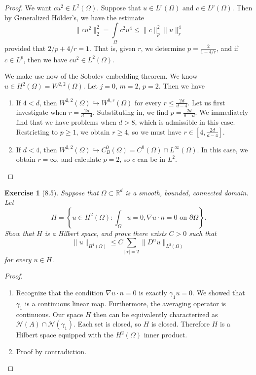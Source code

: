 \documentclass[letterpaper,twoside,11pt]{article}
\theoremstyle{mystyle}
\newtheorem*{exercise}{Exercise}
\newcommand{\R}{{\mathbb R}}
\begin{document}
\begin{proof}
  We want $cu^2 \in L^2 \left( \Omega \right)$. Suppose that $u \in L^r \left( \Omega \right)$ and $c \in L^p (\Omega)$. Then by Generalized H\"older's, we have the estimate
  \[\|cu^2 \|_2^2 = \int\limits_\Omega c^2 u^4 \leq \|c\|_p^2 \|u\|_r^4 \]
  provided that $2/p+4/r=1$. That is, given $r$, we determine $p = \frac{2}{1-4/r}$, and if $c \in L^p$, then we have $c u ^2 \in L^2 \left( \Omega \right)$.  

  We make use now of the Sobolev embedding theorem. We know $ u \in H^2 \left( \Omega \right) = W^{2, 2} \left( \Omega \right)$. Let $j = 0$, $m = 2$, $p = 2$. Then we have 
  \begin{enumerate}
    \item If $4 < d$, then $W^{2,2} (\Omega) \hookrightarrow W^{0,r}\left( \Omega \right)$ for every $r\leq \frac{2d}{d-4}$. Let us first investigate when $r = \frac{2d}{d-4}$. Substituting in, we find $p = \frac{2d}{8-d}$. We immediately find that we have problems when $ d > 8$, which is admissible in this case. Restricting to $p \geq 1$, we obtain $ r \geq 4$, so we must have $ r \in [4, \frac{2d}{d-4}]$. 
    
    \item If $d < 4$, then $W^{2,2} (\Omega) \hookrightarrow C_B^0 (\Omega) = C^0 (\Omega) \cap L^\infty (\Omega)$. In this case, we obtain $ r = \infty$, and calculate $ p = 2$, so $c$ can be in $L^2$. 
  \end{enumerate}
\end{proof}





\newpage
\begin{exercise}[8.5]
  Suppose that $\Omega \subset \R^d$ is a smooth, bounded, connected domain. Let 
  \[H = \left\{ u \in H^2 \left( \Omega \right)  : \int_\Omega u = 0, \nabla u \cdot n = 0 \text{ on } \partial \Omega  \right\}.\]
  Show that $H$ is a Hilbert space, and prove there exists $C > 0$ such that 
  \[\|u\|_{H^1 \left( \Omega \right) } \leq C \sum_{|\alpha| = 2} \|D^\alpha u \|_{L^2 (\Omega)}\]
  for every $u \in H$. 
\end{exercise}

\begin{proof}
  \begin{enumerate}
    \item Recognize that the condition $\nabla u \cdot n = 0$ is exactly $\gamma_1 u = 0$. We showed that $\gamma_1$ is a continuous linear map. Furthermore, the averaging operator is continuous. Our space $H$ then can be equivalently characterized as $\mathcal N (A) \cap \mathcal N(\gamma_1)$. Each set is closed, so $H$ is closed. Therefore $H$ is a Hilbert space equipped with the $H^2(\Omega)$ inner product. 
    \item Proof by contradiction. 
  \end{enumerate}
\end{proof}
\end{document}
